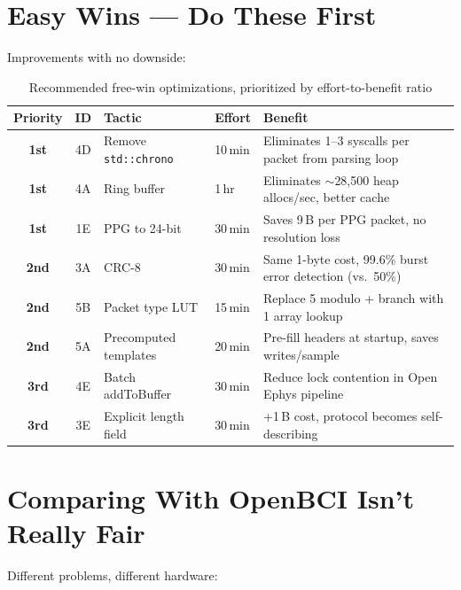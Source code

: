 \documentclass[11pt,a4paper]{article}
\begin{document}
\section{Easy Wins --- Do These First}
\label{sec:free-wins}

Improvements with no downside:

\begin{table}[H]
\centering
\begin{tabularx}{\textwidth}{|c|c|l|l|>{\raggedright\arraybackslash}X|}
\hline
\textbf{Priority} & \textbf{ID} & \textbf{Tactic} & \textbf{Effort} & \textbf{Benefit} \\\hline
\textbf{1st} & 4D & Remove \texttt{std::chrono} & 10\,min & Eliminates 1--3 syscalls per packet from parsing loop \\
\textbf{1st} & 4A & Ring buffer & 1\,hr & Eliminates ${\sim}$28,500 heap allocs/sec, better cache \\
\textbf{1st} & 1E & PPG to 24-bit & 30\,min & Saves 9\,B per PPG packet, no resolution loss \\
\textbf{2nd} & 3A & CRC-8 & 30\,min & Same 1-byte cost, 99.6\% burst error detection (vs.\ 50\%) \\
\textbf{2nd} & 5B & Packet type LUT & 15\,min & Replace 5 modulo + branch with 1 array lookup \\
\textbf{2nd} & 5A & Precomputed templates & 20\,min & Pre-fill headers at startup, saves writes/sample \\
\textbf{3rd} & 4E & Batch addToBuffer & 30\,min & Reduce lock contention in Open Ephys pipeline \\
\textbf{3rd} & 3E & Explicit length field & 30\,min & +1\,B cost, protocol becomes self-describing \\
\hline
\end{tabularx}
\caption{Recommended free-win optimizations, prioritized by effort-to-benefit ratio}
\label{tab:free-wins}
\end{table}

\section{Comparing With OpenBCI Isn't Really Fair}
\label{sec:openbci-comparison}

Different problems, different hardware:
\end{document}
